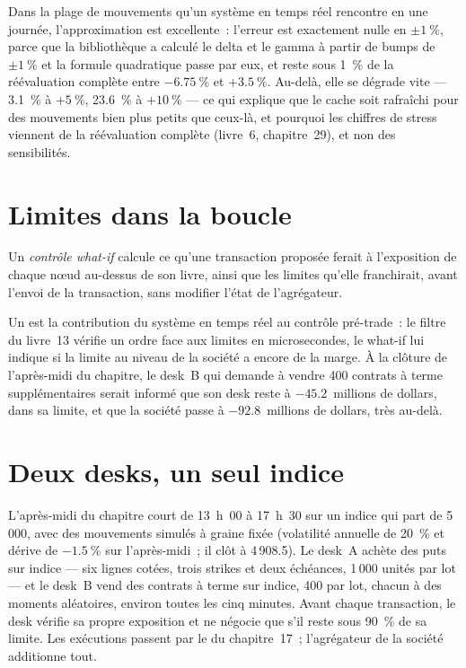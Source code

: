 Dans la plage de mouvements qu'un système en temps réel rencontre en une journée, l'approximation est excellente~: l'erreur est exactement nulle en $\pm 1~\%$, parce que la bibliothèque
a calculé le delta et le gamma à partir de bumps de $\pm 1~\%$ et la formule quadratique passe par eux, et reste sous 1~\% de la réévaluation complète entre
$-6.75~\%$ et $+3.5~\%$. Au-delà, elle se dégrade vite --- 3.1~\% à $+5~\%$, 23.6~\% à $+10~\%$ --- ce qui explique que le cache soit rafraîchi pour des mouvements bien
plus petits que ceux-là, et pourquoi les chiffres de stress viennent de la réévaluation complète (livre~6, chapitre~29), et non des sensibilités.

\section{Limites dans la boucle}

\begin{definition}\label{def:pl:real-time-risk:whatif}
Un \emph{contrôle what-if} calcule ce qu'une transaction proposée ferait à l'exposition de chaque nœud au-dessus de son livre,
ainsi que les limites qu'elle franchirait, avant l'envoi de la transaction, sans modifier l'état de l'agrégateur.
\end{definition}

\label{lst:pl:real-time-risk:whatif}

Un  est la contribution du système en temps réel au contrôle pré-trade~: le filtre du livre~13 vérifie un ordre face aux limites en
microsecondes, le what-if lui indique si la limite au niveau de la société a encore de la marge. À la clôture de l'après-midi du chapitre, le desk~B qui demande à vendre 400
contrats à terme supplémentaires serait informé que son desk reste à $-45.2$~millions de dollars, dans sa limite, et que la société passe à $-92.8$~millions de dollars, très au-delà.

\section{Deux desks, un seul indice}

L'après-midi du chapitre court de 13~h~00 à 17~h~30 sur un indice qui part de 5\,000, avec des mouvements simulés à graine fixée (volatilité annuelle de 20~\% et dérive de
$-1.5~\%$ sur l'après-midi~; il clôt à 4\,908.5). Le desk~A achète des puts sur indice --- six lignes cotées, trois strikes et deux échéances, 1\,000 unités
par lot --- et le desk~B vend des contrats à terme sur indice, 400 par lot, chacun à des moments aléatoires, environ toutes les cinq minutes. Avant chaque transaction, le desk
vérifie sa propre exposition et ne négocie que s'il reste sous 90~\% de sa limite. Les exécutions passent par le  du chapitre~17~;
l'agrégateur de la société additionne tout.

